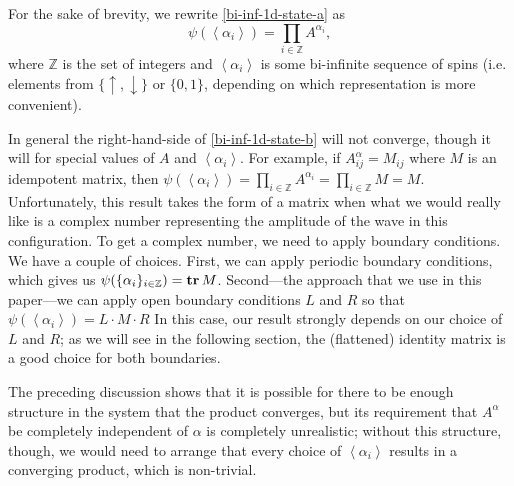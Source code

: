 \documentclass{article}
\newcommand{\seq}[1]{\left<#1\right>}
\newcommand{\tr}{\text{\textbf{tr}}\,}
\newcommand{\Z}{\mathbb{Z}}
\begin{document}
For the sake of brevity, we rewrite \eqref{bi-inf-1d-state-a} as
\begin{equation}
\label{bi-inf-1d-state-b}
\psi(\seq{\alpha_i}) = \prod_{i\in\Z} A^{\alpha_i},
\end{equation}
where $\Z$ is the set of integers and $\seq{\alpha_i}$ is some bi-infinite sequence of spins (i.e. elements from $\{\uparrow,\downarrow\}$ or $\{0,1\}$, depending on which representation is more convenient).

In general the right-hand-side of \eqref{bi-inf-1d-state-b} will not converge, though it will for special values of $A$ and $\seq{\alpha_i}$.  For example, if $A^\alpha_{ij}=M_{ij}$ where $M$ is an idempotent matrix, then $\psi(\seq{\alpha_i})=\prod_{i\in\Z} A^{\alpha_i} = \prod_{i\in\Z} M = M$.  Unfortunately, this result takes the form of a matrix when what we would really like is a complex number representing the amplitude of the wave in this configuration.  To get a complex number, we need to apply boundary conditions.  We have a couple of choices.  First, we can apply periodic boundary conditions, which gives us $\psi(\{\alpha_i\}_{i\in\Z})=\tr M$.  Second---the approach that we use in this paper---we can apply open boundary conditions $L$ and $R$ so that $\psi(\seq{\alpha_i})=L\cdot M\cdot R$  In this case, our result strongly depends on our choice of $L$ and $R$; as we will see in the following section, the (flattened) identity matrix is a good choice for both boundaries.

The preceding discussion shows that it is possible for there to be enough structure in the system that the product converges, but its requirement that $A^\alpha$ be completely independent of $\alpha$ is completely unrealistic;  without this structure, though, we would need to arrange that every choice of $\seq{\alpha_i}$ results in a converging product, which is non-trivial.
\end{document}
